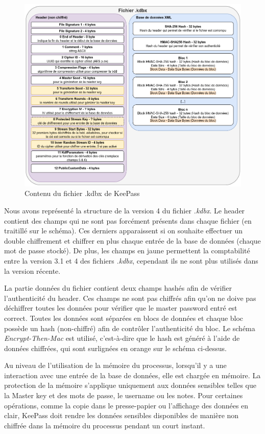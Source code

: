 \begin{figure}[H]
	\includegraphics[width=15.5cm]{images/keepass_local.png}
	\centering
	\caption{Contenu du fichier .kdbx de KeePass}
	\label{kp_file}
\end{figure}

Nous avons représenté la structure de la version 4 du fichier \textit{.kdbx}\cite{kp4}. Le header contient des champs qui ne sont pas forcément présents dans chaque fichier (en traitillé sur le schéma). Ces derniers apparaissent si on souhaite effectuer un double chiffrement et chiffrer en plus chaque entrée de la base de données (chaque mot de passe stocké). De plus, les champs en jaune permettent la comptabilité entre la version 3.1 et 4 des fichiers \textit{.kdbx}, cependant ils ne sont plus utilisés dans la version récente. 

La partie données du fichier contient deux champs hashés afin de vérifier l'authenticité du header. Ces champs ne sont pas chiffrés afin qu'on ne doive pas déchiffrer toutes les données pour vérifier que le master password entré est correct. Toutes les données sont séparées en blocs de données et chaque bloc possède un hash (non-chiffré) afin de contrôler l'authenticité du bloc. Le schéma \textit{Encrypt-Then-Mac} est utilisé, c'est-à-dire que le hash est généré à l'aide de données chiffrées, qui sont surlignées en orange sur le schéma ci-dessus. 

Au niveau de l'utilisation de la mémoire du processus, lorsqu'il y a une interaction avec une entrée de la base de données, elle est chargée en mémoire. La protection de la mémoire s'applique uniquement aux données sensibles telles que la Master key et des mots de passe, le username ou les notes. Pour certaines opérations, comme la copie dans le presse-papier ou l'affichage des données en clair, KeePass doit rendre les données sensibles disponibles de manière non chiffrée dans la mémoire du processus pendant un court instant.  

